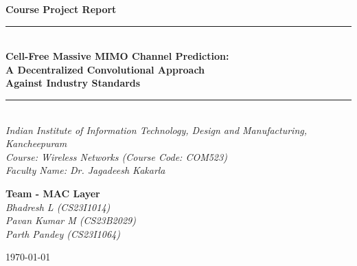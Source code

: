\documentclass[12pt,a4paper]{article}
\begin{document}
\begin{titlepage}
  \centering
  \vspace*{2cm}
  {\LARGE\bfseries Course Project Report}\\[0.6em]
  \rule{\linewidth}{0.8pt}\\[0.8em]
  {\Large\bfseries Cell-Free Massive MIMO Channel Prediction:\\[0.5em]
   A Decentralized Convolutional Approach\\[0.5em]
   Against Industry Standards}\\[0.8em]
  \rule{\linewidth}{0.8pt}\\[2.0cm]

  {\normalsize\itshape
  Indian Institute of Information Technology, Design and Manufacturing, Kancheepuram\\[0.3em]
  Course: Wireless Networks (Course Code: COM523)\\[0.3em]
  Faculty Name: Dr. Jagadeesh Kakarla}\\[2.5cm]

  \begin{minipage}{0.85\linewidth}
    \centering
    {\small\textbf{Team - MAC Layer}}\\[0.5em]
    {\normalsize\itshape
    Bhadresh L \quad (CS23I1014)\\[0.3em]
    Pavan Kumar M \quad (CS23B2029)\\[0.3em]
    Parth Pandey \quad (CS23I1064)
    }
  \end{minipage}

  \vfill
  {\small\today}
\end{titlepage}

\renewcommand{\abstractname}{Abstract}
\begin{abstract}
\noindent
Predicting high-mobility fading channels in Cell-Free Massive MIMO (CF-mMIMO) systems is notoriously difficult. While classical state-space models and recent deep learning architectures favor centralized coordination, our work fundamentally challenges this trend. Our initial hypothesis utilized a hybrid Graph Neural Network (GNN) and Convolutional Neural Network (CNN) architecture to model spatial correlation across distributed Access Points (APs). However, extensive empirical iteration revealed that a purely decentralized, localized architecture (CNN-Only) significantly outperforms both the GNN-CNN hybrid and industry-standard Vector Kalman Filters. This report details the literature background, theoretical foundation, and the chronologically tracked experimental results establishing the superiority of the CNN-Only architecture.
\end{abstract}
\end{document}
